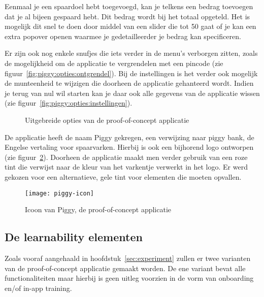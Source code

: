 Eenmaal je een spaardoel hebt toegevoegd, kan je telkens een bedrag toevoegen dat je al bijeen gespaard hebt. Dit bedrag wordt bij het totaal opgeteld. Het is mogelijk dit snel te doen door middel van een slider die tot 50 gaat of je kan een extra popover openen waarmee je gedetailleerder je bedrag kan specificeren.

Er zijn ook nog enkele snufjes die iets verder in de menu's verborgen zitten, zoals de mogelijkheid om de applicatie te vergrendelen met een pincode (zie figuur~\ref{fig:piggy:opties:ontgrendel}). Bij de instellingen is het verder ook mogelijk de munteenheid te wijzigen die doorheen de applicatie gehanteerd wordt. Indien je terug van nul wil starten kan je daar ook alle gegevens van de applicatie wissen (zie figuur~\ref{fig:piggy:opties:instellingen}).

\begin{figure}[h!]
    \centering
    \qquad
    \caption{Uitgebreide opties van de proof-of-concept applicatie}
    \label{fig:piggy:opties}
\end{figure}

De applicatie heeft de naam Piggy gekregen, een verwijzing naar piggy bank, de Engelse vertaling voor spaarvarken. Hierbij is ook een bijhorend logo ontworpen (zie figuur~\ref{fig:piggy:icoon}). Doorheen de applicatie maakt men verder gebruik van een roze tint die verwijst naar de kleur van het varkentje verwerkt in het logo. Er werd gekozen voor een alternatieve, gele tint voor elementen die moeten opvallen.

\begin{figure}[h!]
    \centering
    \texttt{[image: piggy-icon]}
    \caption{Icoon van Piggy, de proof-of-concept applicatie}
    \label{fig:piggy:icoon}
\end{figure}

\subsection{De learnability elementen}
\label{sec:applicatie:learnability-elementen}

Zoals vooraf aangehaald in hoofdstuk~\ref{sec:experiment} zullen er twee varianten van de proof-of-concept applicatie gemaakt worden. De ene variant bevat alle functionaliteiten maar hierbij is geen uitleg voorzien in de vorm van onboarding en/of in-app training.

